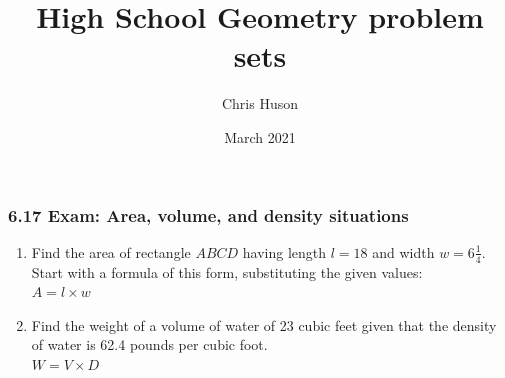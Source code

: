 \documentclass[12pt, twoside]{article}
\title{High School Geometry problem sets}
\author{Chris Huson}
\date{March 2021}
\begin{document}
\subsubsection*{6.17 Exam: Area, volume, and density situations}
\begin{enumerate}

\item Find the area of rectangle $ABCD$ having length $l=18$ and width $w=6 \frac{1}{4}$. Start with a formula of this form, substituting the given values: \\[0.5cm]
$A = l \times w$
  \begin{flushright}
  \end{flushright}

\newpage
\item Find the weight of a volume of water of 23 cubic feet given that the density of water is 62.4 pounds per cubic foot.  \\[0.5cm]
$W=V \times D$


\end{enumerate}
\end{document}
